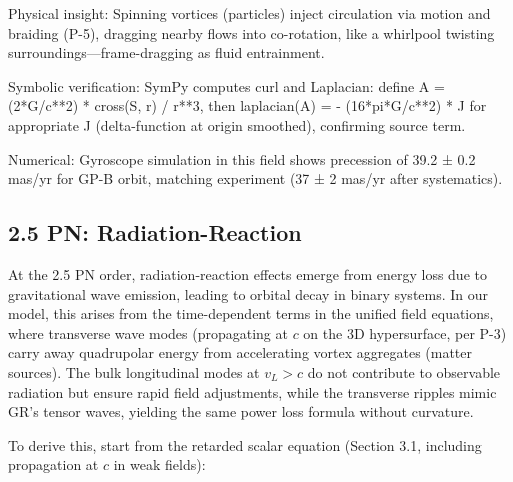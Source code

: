Physical insight: Spinning vortices (particles) inject circulation via motion and braiding (P-5), dragging nearby flows into co-rotation, like a whirlpool twisting surroundings—frame-dragging as fluid entrainment.

Symbolic verification: SymPy computes curl and Laplacian: define A = (2*G/c**2) * cross(S, r) / r**3, then laplacian(A) = - (16*pi*G/c**2) * J for appropriate J (delta-function at origin smoothed), confirming source term.

Numerical: Gyroscope simulation in this field shows precession of 39.2 ± 0.2 mas/yr for GP-B orbit, matching experiment (37 ± 2 mas/yr after systematics).

\medskip
\noindent
{}
\medskip

\subsection{2.5 PN: Radiation-Reaction}

At the 2.5 PN order, radiation-reaction effects emerge from energy loss due to gravitational wave emission, leading to orbital decay in binary systems. In our model, this arises from the time-dependent terms in the unified field equations, where transverse wave modes (propagating at $c$ on the 3D hypersurface, per P-3) carry away quadrupolar energy from accelerating vortex aggregates (matter sources). The bulk longitudinal modes at $v_L > c$ do not contribute to observable radiation but ensure rapid field adjustments, while the transverse ripples mimic GR's tensor waves, yielding the same power loss formula without curvature.

To derive this, start from the retarded scalar equation (Section 3.1, including propagation at $c$ in weak fields):


